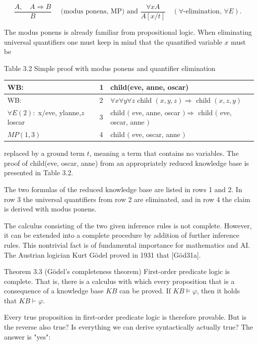 \documentclass[10pt]{book}
\begin{document}
$$
\frac{A, \quad A \Rightarrow B}{B} \quad \text { (modus ponens, MP) and } \frac{\forall x A}{A[x / t]} \quad(\forall \text {-elimination, } \forall E) \text {. }
$$

The modus ponens is already familiar from propositional logic. When eliminating universal quantifiers one must keep in mind that the quantified variable $x$ must be

Table 3.2 Simple proof with modus ponens and quantifier elimination

\begin{center}
\begin{tabular}{lll}
\hline
WB: & 1 & child(eve, anne, oscar) \\
\hline
WB: & 2 & $\forall x \forall y \forall z$ child $(x, y, z) \Rightarrow$ child $(x, z, y)$ \\
\hline
$\forall E(2):$ x/eve, ylanne,$z$ loscar & 3 & child $($ eve, anne, oscar $) \Rightarrow$ child $($ eve, oscar, anne $)$ \\
\hline
$M P(1,3)$ & 4 & child $($ eve, oscar, anne $)$ \\
\hline
\end{tabular}
\end{center}

replaced by a ground term $t$, meaning a term that contains no variables. The proof of child(eve, oscar, anne) from an appropriately reduced knowledge base is presented in Table 3.2.


The two formulas of the reduced knowledge base are listed in rows 1 and 2. In row 3 the universal quantifiers from row 2 are eliminated, and in row 4 the claim is derived with modus ponens.

The calculus consisting of the two given inference rules is not complete. However, it can be extended into a complete procedure by addition of further inference rules. This nontrivial fact is of fundamental importance for mathematics and AI. The Austrian logician Kurt Gödel proved in 1931 that [Göd31a].

Theorem 3.3 (Gödel's completeness theorem) First-order predicate logic is complete. That is, there is a calculus with which every proposition that is a consequence of a knowledge base $K B$ can be proved. If $K B \models \varphi$, then it holds that $K B \vdash \varphi$.

Every true proposition in first-order predicate logic is therefore provable. But is the reverse also true? Is everything we can derive syntactically actually true? The answer is "yes":
\end{document}
